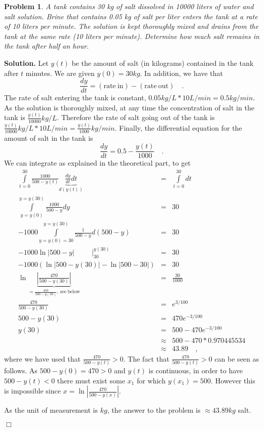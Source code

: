 \documentclass[12pt]{book}
\newenvironment{solution}{\textbf{Solution.} }{$\Box$}
\newtheorem{problem}{Problem}[section]
\begin{document}
\begin{problem}
A tank contains 30 kg of salt dissolved in 10000 liters of water and salt solution. Brine that contains 0.05 kg of salt per liter enters the tank at a rate of 10 liters per minute. The solution is kept thoroughly mixed and drains from the tank at the same rate (10 liters per minute). Determine how much salt remains in the tank after half an hour.
\end{problem}
\begin{solution}
Let $y(t)$ be the amount of salt (in kilograms) contained in the tank after $t$ minutes. We are given $y(0)= 30kg$. In addition, we have that 
\[
\frac{dy}{dt}= \mathrm{(rate~in)}-\mathrm{(rate~out)} \quad .
\]
The rate of salt entering the tank is constant, $0.05 kg/L *10 L/min= 0.5 kg/min$. As the solution is thoroughly mixed, at any time the concentration of salt in the tank is $\frac{y(t)}{10000} kg/L$. Therefore the rate of salt going out of the tank is $\frac{y(t)}{10000} kg/L * 10 L/min= \frac{y(t)}{1000} kg/min$. Finally, the differential equation for the amount of salt in the tank is
\[
\frac{dy}{dt}= 0.5-\frac{y(t)}{1000} \quad .
\]
We can integrate as explained in the theoretical part, to get 
\[
\begin{array}{rcl}
\int\limits_{t=0}^{30} \frac{1000}{500-y(t)}\underbrace{\frac{dy}{dt} dt}_{d(y(t))} &=& \int\limits_{t=0}^{30} dt \\
\int\limits_{y=y(0)}^{y=y(30)} \frac{1000}{500-y}dy&=& 30 \\
-1000\int\limits_{y=y(0)=30}^{y=y(30)} \frac{1}{500-y}d(500-y)&=& 30 \\
\left. -1000 \ln |500-y|~~~~~~~~~~~ \right|_{30}^{y(30)}&=& 30 \\
-1000 \left(\ln |500-y(30)| -\ln |500- 30|  \right)&=& 30 \\
\ln\underbrace{\left| \frac{470}{500-y(30)} \right|}_{=\frac{470}{500-y(30)}\mathrm{,~see~below} } &=& \frac{30}{1000} \\
\frac{470}{500-y(30)}&=&e^{3/100}\\
500-y(30)&=& 470e^{-3/100}\\
y(30)&=&500-470e^{-3/100}\\
&\approx& 500-470*0.970445534 \\
&\approx& 43.89 \quad ,
\end{array}
\]
where we have used that $ \frac{470}{500-y(t)}>0 $. The fact that $ \frac{470}{500-y(t)}>0 $ can be seen as follows. As $500-y(0)=470>0$ and $y(t)$ is continuous, in order to have $500-y(t)<0$ there must exist some $x_1$ for which $y(x_1)=500$. However this is impossible since $x=\ln \left|\frac{470}{500-y(x)}\right|  $. 

As the unit of measurement is $kg$, the answer to the problem is $\approx 43.89 kg$ salt.

\end{solution}
\end{document}
